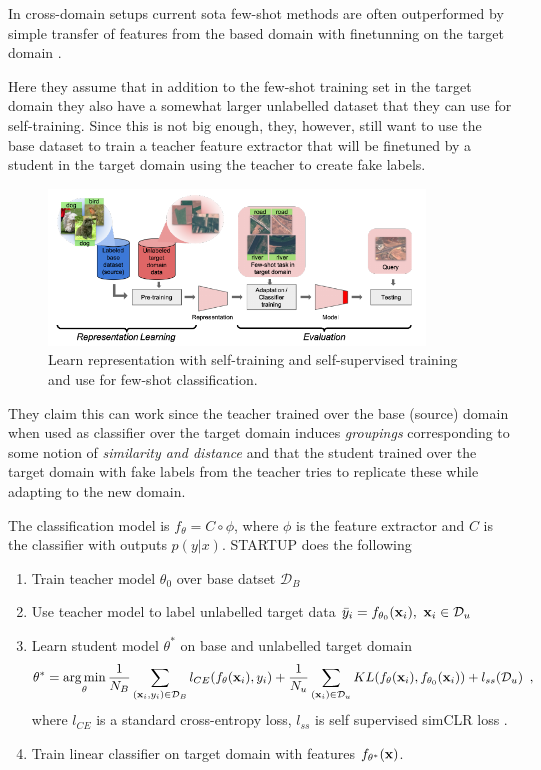In cross-domain setups current sota few-shot methods are often outperformed by simple transfer of features from the based domain with finetunning on the target domain \parencite{wallace_extending_2020,guo_broader_2020}.

Here they assume that in addition to the few-shot training set in the target domain they also have a somewhat larger unlabelled dataset that they can use for self-training.
Since this is not big enough, they, however, still want to use the base dataset to train a teacher feature extractor that will be finetuned by a student in the target domain using the teacher to create fake labels. 

\begin{figure}[ht]
\centering
\includegraphics[width=10cm]{startup_Figure1.png}
\caption{Learn representation with self-training and self-supervised training and use for few-shot classification.}
\end{figure}

They claim this can work since the teacher trained over the base (source) domain when used as classifier over the target domain induces \emph{groupings} corresponding to some notion of \emph{similarity and distance} and that the student trained over the target domain with fake labels from the teacher tries to replicate these while adapting to the new domain.

The classification model is $f_{\theta} = C \circ \phi$, where $\phi$ is the feature extractor and $C$ is the classifier with outputs $p(y|x)$. STARTUP does the following
\begin{enumerate}[nosep]
\item Train teacher model $\theta_0$ over base datset $\mathcal{D}_B$
\item Use teacher model to label unlabelled target data $\bar{y}_i = f_{\theta_0}({\mathbf{x}}_i), \ {\mathbf{x}}_i \in \mathcal{D}_u$
\item Learn student model $\theta^*$ on base and unlabelled target domain
\begin{align*}
\theta^* = \operatorname*{arg\,min}_\theta \frac{1}{N_B} \sum_{({\mathbf{x}}_i, y_i) \in \mathcal{D}_B} l_{CE}(f_\theta({\mathbf{x}}_i), y_i) + \frac{1}{N_u} \sum_{({\mathbf{x}}_i) \in \mathcal{D}_u} KL(f_\theta({\mathbf{x}}_i), f_{\theta_0}({\mathbf{x}}_i)) + l_{ss}(\mathcal{D}_u) \enspace ,
\end{align*}
where $l_{CE}$ is a standard cross-entropy loss, $l_{ss}$ is self supervised simCLR loss \parencite{chen_simple_2020}.
\item Train linear classifier on target domain with features $f_{\theta^*}({\mathbf{x}})$.
\end{enumerate}

